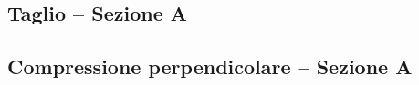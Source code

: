 \begin{pysub}[TraveDoppiaRastremazione]
\subsection{Taglio -- Sezione A}
\subsection{Compressione perpendicolare -- Sezione A}









\end{pysub}